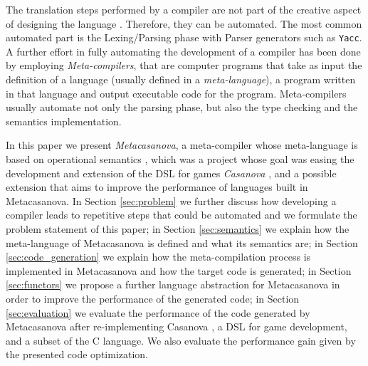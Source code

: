 The translation steps performed by a compiler are not part of the creative aspect of designing the language \cite{book1970cwic, czarnecki2000generative}. Therefore, they can be automated. The most common automated part is the Lexing/Parsing phase with Parser generators such as \texttt{Yacc}. A further effort in fully automating the development of a compiler has been done by employing \textit{Meta-compilers}, that are computer programs that take as input the definition of a language (usually defined in a \textit{meta-language}), a program written in that language and output executable code for the program. Meta-compilers usually automate not only the parsing phase, but also the type checking and the semantics implementation.
 
In this paper we present \textit{Metacasanova}, a meta-compiler whose meta-language is based on operational semantics \cite{plotkin1981, kahn1987natural}, which was a project whose goal was easing the development and extension of the DSL for games \textit{Casanova} \cite{abbadi2015casanova, abbadithesis2017, DIGIACOMO201725}, and a possible extension that aims to improve the performance of languages built in Metacasanova. In Section \ref{sec:problem} we further discuss how developing a compiler leads to repetitive steps that could be automated and we formulate the problem statement of this paper; in Section \ref{sec:semantics} we explain how the meta-language of Metacasanova is defined and what its semantics are; in Section \ref{sec:code_generation} we explain how the meta-compilation process is implemented in Metacasanova and how the target code is generated; in Section \ref{sec:functors} we propose a further language abstraction for Metacasanova in order to improve the performance of the generated code; in Section \ref{sec:evaluation} we evaluate the performance of the code generated by Metacasanova after re-implementing Casanova \cite{abbadi2015casanova}, a DSL for game development, and a subset of the C language. We also evaluate the performance gain given by the presented code optimization.


